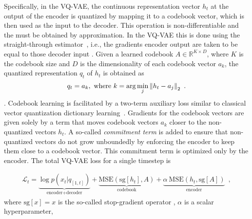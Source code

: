 Specifically, in the VQ-VAE, the continuous representation vector $h_t$ at the output of the encoder is quantized by mapping it to a codebook vector, which is then used as the input to the decoder. This operation is non-differentiable and the  must be obtained by approximation. In the VQ-VAE this is done using the straight-through estimator~\cite{bengio_estimating_2013}, i.e., the gradients  encoder output are taken to be equal to those  decoder input . Given a learned codebook $A\in\mathbb{R}^{K \times D}$, where $K$ is the codebook size and $D$ is the dimensionality of each codebook vector $a_k$, the quantized representation $q_t$ of $h_t$ is obtained as
\begin{align}
    q_t = a_k, \text{ where } k=\arg\min_j {\left\lVert h_t - a_j\right\rVert}_2 \enspace .
\end{align}
. 
Codebook learning is facilitated by a two-term auxiliary loss similar to
classical vector quantization dictionary 
learning~\cite{burton_generalization_1983, soong_vector_1985}. 
Gradients for the codebook vectors are given solely by a term that moves
codebook vectors $a_k$ closer to the non-quantized vectors $h_t$. A so-called
\emph{commitment term} is added to ensure that non-quantized vectors do not grow
unboundedly by enforcing the encoder to keep them close to a codebook vector.
This commitment term is optimized only by the encoder. The
total VQ-VAE loss for a single timestep is

\begin{align}
    \mathcal{L}_t = \underset{\text{encoder+decoder}}{\underbrace{\log p(x_t | q_{[1,t]})}}
     + \underset{\text{codebook}}{\underbrace{\text{MSE}\left(\mathrm{sg}\left[h_t\right], A\right)}}
     + \underset{\text{encoder}}{\underbrace{\alpha~\text{MSE}\left(h_t, \mathrm{sg}\left[A\right]\right)}} \enspace ,
    \label{eq: vector quantization losses}
\end{align}%
\noindent where  $\mathrm{sg}[x] = x$ is the so-called stop-gradient operator , $\alpha$ is a scalar hyperparameter, 


